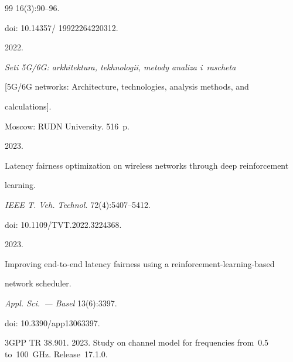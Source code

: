 {{\begin{thebibliography}{99}
16(3):90--96.


doi: 10.14357\!/ 19922264220312.









2022.


\textit{Seti 5G/6G: arkhitektura, tekhnologii, metody analiza i~rascheta}


[5G\!/\!6G networks: Architecture, technologies, analysis methods, and 


calculations].


Moscow: RUDN University. 516~p.









2023.


Latency fairness optimization on wireless networks through deep reinforcement 


learning.


\textit{IEEE T. Veh. Technol.} 72(4):5407--5412.


doi: 10.1109\!/\!TVT.2022.3224368.









2023.


Improving end-to-end latency fairness using a reinforcement-learning-based 


network scheduler.


\textit{Appl. Sci.~--- Basel} 13(6):3397.


doi: 10.3390\!/\!app13063397.







3GPP TR 38.901. 2023. Study on channel model for frequencies from~0.5 to~100~GHz. Release~17.1.0.








\end{thebibliography}}}
